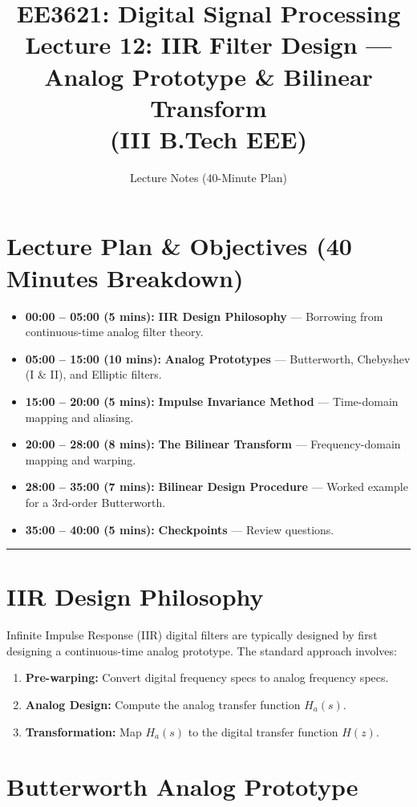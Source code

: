 \documentclass[11pt,a4paper]{article}
\title{\textbf{EE3621: Digital Signal Processing} \\ \Large Lecture 12: IIR Filter Design — Analog Prototype \& Bilinear Transform \\ \large (III B.Tech EEE)}
\author{Lecture Notes (40-Minute Plan)}
\date{}
\begin{document}
\maketitle

\section{Lecture Plan \& Objectives (40 Minutes Breakdown)}
\begin{itemize}
    \item \textbf{00:00 -- 05:00 (5 mins):} \textbf{IIR Design Philosophy} --- Borrowing from continuous-time analog filter theory.
    \item \textbf{05:00 -- 15:00 (10 mins):} \textbf{Analog Prototypes} --- Butterworth, Chebyshev (I \& II), and Elliptic filters.
    \item \textbf{15:00 -- 20:00 (5 mins):} \textbf{Impulse Invariance Method} --- Time-domain mapping and aliasing.
    \item \textbf{20:00 -- 28:00 (8 mins):} \textbf{The Bilinear Transform} --- Frequency-domain mapping and warping.
    \item \textbf{28:00 -- 35:00 (7 mins):} \textbf{Bilinear Design Procedure} --- Worked example for a 3rd-order Butterworth.
    \item \textbf{35:00 -- 40:00 (5 mins):} \textbf{Checkpoints} --- Review questions.
\end{itemize}

\noindent\rule{\textwidth}{0.5pt}

\section{IIR Design Philosophy}
Infinite Impulse Response (IIR) digital filters are typically designed by first designing a continuous-time analog prototype. The standard approach involves:
\begin{enumerate}
    \item \textbf{Pre-warping:} Convert digital frequency specs to analog frequency specs.
    \item \textbf{Analog Design:} Compute the analog transfer function $H_a(s)$.
    \item \textbf{Transformation:} Map $H_a(s)$ to the digital transfer function $H(z)$.
\end{enumerate}

\section{Butterworth Analog Prototype}
\end{document}
